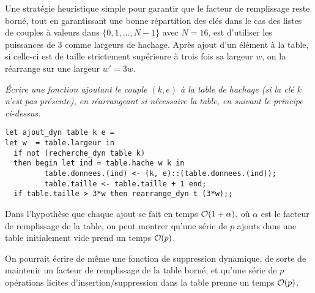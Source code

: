 Une stratégie heuristique simple pour garantir que le facteur de
remplissage reste borné, tout en garantissant une bonne répartition des
clés dans le cas des listes de couples à valeurs dans $\{0, 1, \ldots, N-1\}$ avec
$N=16$, est d’utiliser les puissances de 3 comme largeurs de hachage.
Après ajout d’un élément à la table, si celle-ci est de taille
strictement supérieure à trois fois sa largeur $w$, on la réarrange sur
une largeur $w'=3w$.
\begin{Exercise}\it
Écrire une fonction  ajoutant le couple $(k, e)$ à
la table de hachage (si la clé $k$ n’est pas présente), en réarrangeant
si nécessaire la table, en suivant le principe ci-dessus.
\end{Exercise}
\begin{Answer}
\begin{lstlisting}
let ajout_dyn table k e =
let w  = table.largeur in
  if not (recherche_dyn table k) 
  then begin let ind = table.hache w k in
         table.donnees.(ind) <- (k, e)::(table.donnees.(ind));
         table.taille <- table.taille + 1 end;
  if table.taille > 3*w then rearrange_dyn t (3*w);;
\end{lstlisting}
\end{Answer}

\medskip

Dans l’hypothèse que chaque ajout se fait en
temps ${\cal O}(1+\alpha)$, où $\alpha$ est le facteur de remplissage de la
table, on peut montrer qu’une série de $p$ ajouts dans une table initialement
vide prend un temps ${\cal O}(p)$.

On pourrait écrire de même une fonction de suppression dynamique, de sorte de maintenir
un facteur de remplissage de la table borné, et qu’une série de
$p$ opérations licites d’insertion/suppression dans la table prenne un
temps ${\cal O}(p)$.